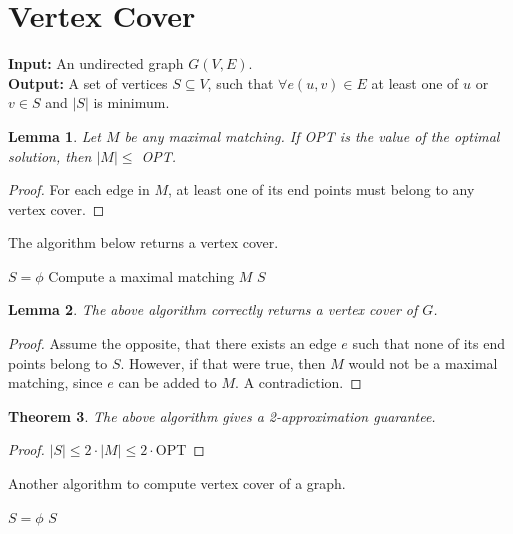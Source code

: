 \documentclass[10pt]{article}
\newtheorem{theorem}{Theorem}[section]
\newtheorem{lemma}[theorem]{Lemma}
\begin{document}
\section{Vertex Cover}
\textbf{Input: } An undirected graph $G(V,E)$. \\
\textbf{Output: } A set of vertices $S \subseteq V$, such that $\forall e(u, v) \in E$ at least one of $u$ or $v \in S$ and $|S|$ is 
minimum. \\

\begin{lemma}
Let $M$ be any maximal matching. If OPT is the value of the optimal solution, then $|M| \leq$ OPT.
\end{lemma}
\begin{proof}
For each edge in $M$, at least one of its end points must belong to any vertex cover.
\end{proof}

The algorithm below returns a vertex cover.

\begin{algorithm}[H]
\dontprintsemicolon
{}
$S = \phi$ \;
Compute a maximal matching $M$ \;
\Return $S$ 
\end{algorithm}

\begin{lemma}
The above algorithm correctly returns a vertex cover of $G$.
\end{lemma}
\begin{proof}
Assume the opposite, that there exists an edge $e$ such that none of its end points belong to $S$. However, if that were true, then $M$ would not be a maximal matching, since $e$ can be added to $M$. A contradiction.
\end{proof}

\begin{theorem}
The above algorithm gives a 2-approximation guarantee.
\end{theorem}
\begin{proof}
$|S| \leq 2 \cdot |M| \leq 2 \cdot$OPT
\end{proof}
\bigskip

Another algorithm to compute vertex cover of a graph.


\begin{algorithm}[H]
\dontprintsemicolon
{}
$S = \phi$ \;
\Return $S$
\end{algorithm}
\end{document}
